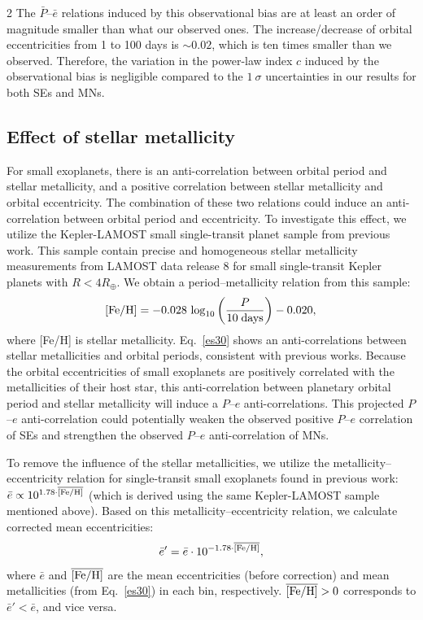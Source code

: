 \documentclass[10pt]{article}
\begin{document}
\begin{multicols}{2}
The $\bar{P}$--$\bar{e}$ relations induced by this observational bias are at least an order of magnitude smaller than what our observed ones.
The increase/decrease of orbital eccentricities from 1 to 100 days is $\sim 0.02$, which is ten times smaller than we observed.
Therefore, the variation in the power-law index $c$ induced by the observational bias is negligible compared to the $1~\sigma$ uncertainties in our results for both SEs and MNs.

\subsection*{\hypertarget{s9}{Effect of stellar metallicity}}
\noindent For small exoplanets, there is an anti-correlation between orbital period and stellar metallicity\cite{2013A&A...560A..51A,2016AJ....152..187M}, and a positive correlation between stellar metallicity and orbital eccentricity\cite{2019AJ....157..198M,2023AJ....165..125A}.
The combination of these two relations could induce an anti-correlation between orbital period and eccentricity.
To investigate this effect, we utilize the Kepler-LAMOST small single-transit planet sample from previous work\cite{2023AJ....165..125A}.
This sample contain precise and homogeneous stellar metallicity measurements from LAMOST data release 8\cite{2012RAA....12.1197C} for small single-transit Kepler planets with $R<4R_\oplus$.
We obtain a period--metallicity relation from this sample:
\begin{equation}
\label{es30}
{\rm [Fe/H]} = -0.028~{\rm log}_{10}\left(\frac{P}{10\;{\rm days}}\right)-0.020, \\
\end{equation}
where [Fe/H] is stellar metallicity.
Eq.~\ref{es30} shows an anti-correlations between stellar metallicities and orbital periods, consistent with previous works\cite{2013A&A...560A..51A,2016AJ....152..187M}.
Because the orbital eccentricities of small exoplanets are positively correlated with the metallicities of their host star\cite{2019AJ....157..198M,2023AJ....165..125A}, this anti-correlation between planetary orbital period and stellar metallicity will induce a $P$--$e$ anti-correlations.
This projected $P$--$e$ anti-correlation could potentially weaken the observed positive $P$--$e$ correlation of SEs and strengthen the observed $P$--$e$ anti-correlation of MNs.

To remove the influence of the stellar metallicities, we utilize the metallicity--eccentricity relation for single-transit small exoplanets found in previous work\cite{2023AJ....165..125A}: $\bar{e}\propto10^{1.78\cdot{\rm \overline{[Fe/H]}}}$ (which is derived using the same Kepler-LAMOST sample mentioned above).
Based on this metallicity--eccentricity relation, we calculate corrected mean eccentricities:
\begin{equation}
\label{es31}
\bar{e}' = \bar{e} \cdot 10^{-1.78\cdot{\rm \overline{[Fe/H]}}},
\end{equation}
where $\bar{e}$ and $\overline{\rm [Fe/H]}$ are the mean eccentricities (before correction) and mean metallicities (from Eq.~\ref{es30}) in each bin, respectively.
$\overline{\rm [Fe/H]}>0$ corresponds to $\bar{e}'<\bar{e}$, and vice versa.


\end{multicols}
\end{document}
